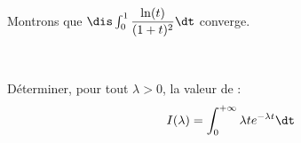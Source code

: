 \documentclass[a4paper,10pt]{report}
\begin{document}
\medskip


\begin{ex} Montrons que $\dis \int_{0}^1  \dfrac{\ln(t)}{(1+t)^2} \dt$ converge.

%

\vspace{8cm}
\end{ex}

\newpage

$\phantom{test}$

\vspace{4cm}

\begin{exa} Déterminer, pour tout $\lambda>0$, la valeur de :
$$ I(\lambda) = \int_{0}^{+ \infty} \lambda t e^{-\lambda t} \dt$$
\end{exa}
\end{document}
